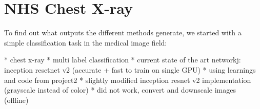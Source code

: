 \chapter{NHS Chest X-ray}
To find out what outputs the different methods generate, we started with a simple classification task in the medical image field:

* chest x-ray
* multi label classification
* current state of the art networkj: inception  resetnet v2 (accurate + fast to train on single GPU)
* using learnings and code from project2
* slightly modified inception resnet v2 implementation (grayscale instead of color)
* did not work, convert and downscale images (offline)